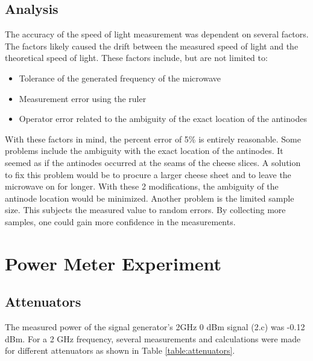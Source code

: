 \documentclass[journal]{IEEEtran}
\begin{document}
\subsection{Analysis}

The accuracy of the speed of light measurement was dependent on several factors.
The factors likely caused the drift between the measured speed of light and the
theoretical speed of light. These factors include, but are not limited to:
\begin{itemize}
    \item Tolerance of the generated frequency of the microwave 
    \item Measurement error using the ruler
    \item Operator error related to the ambiguity of the exact location of the antinodes
\end{itemize}
With these factors in mind, the percent error of 5\% is entirely reasonable. Some
problems include the ambiguity with the exact location of the antinodes. It
seemed as if the antinodes occurred at the seams of the cheese slices. A
solution to fix this problem would be to procure a larger cheese sheet and to
leave the microwave on for longer. With these 2 modifications, the ambiguity of
the antinode location would be minimized. Another problem is the limited sample
size. This subjects the measured value to random errors. By collecting more
samples, one could gain more confidence in the measurements.

\section{Power Meter Experiment}

\subsection{Attenuators}
The measured power of the signal generator's 2GHz 0 dBm signal (2.c) was -0.12
dBm. For a 2 GHz frequency, several measurements and calculations were made for
different attenuators as shown in Table \ref{table:attenuators}.
\end{document}
